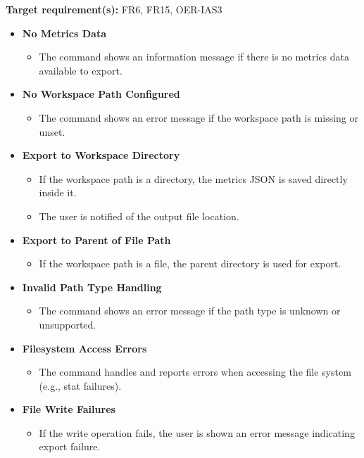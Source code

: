 \documentclass[12pt, titlepage]{article}
\begin{document}
\medskip

\noindent\textbf{Target requirement(s):} FR6, FR15, OER-IAS3~\cite{SRS} \\

\begin{itemize}
  \item \textbf{No Metrics Data}
    \begin{itemize}
      \item The command shows an information message if there is no metrics data available to export.
    \end{itemize}

  \item \textbf{No Workspace Path Configured}
    \begin{itemize}
      \item The command shows an error message if the workspace path is missing or unset.
    \end{itemize}

  \item \textbf{Export to Workspace Directory}
    \begin{itemize}
      \item If the workspace path is a directory, the metrics JSON is saved directly inside it.
      \item The user is notified of the output file location.
    \end{itemize}

  \item \textbf{Export to Parent of File Path}
    \begin{itemize}
      \item If the workspace path is a file, the parent directory is used for export.
    \end{itemize}

  \item \textbf{Invalid Path Type Handling}
    \begin{itemize}
      \item The command shows an error message if the path type is unknown or unsupported.
    \end{itemize}

  \item \textbf{Filesystem Access Errors}
    \begin{itemize}
      \item The command handles and reports errors when accessing the file system (e.g., stat failures).
    \end{itemize}

  \item \textbf{File Write Failures}
    \begin{itemize}
      \item If the write operation fails, the user is shown an error message indicating export failure.
    \end{itemize}
\end{itemize}
\end{document}
